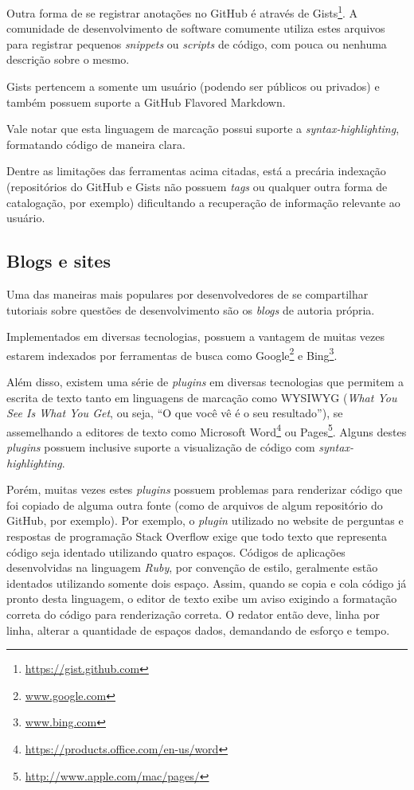 Outra forma de se registrar anotações no GitHub é através de Gists\footnote{\url{https://gist.github.com}}. A comunidade de desenvolvimento de software comumente utiliza estes arquivos para registrar pequenos \textit{snippets} ou \textit{scripts} de código, com pouca ou nenhuma descrição sobre o mesmo.

Gists pertencem a somente um usuário (podendo ser públicos ou privados) e também possuem suporte a GitHub Flavored Markdown.

Vale notar que esta linguagem de marcação possui suporte a \textit{syntax-highlighting}, formatando código de maneira clara.

Dentre as limitações das ferramentas acima citadas, está a precária indexação (repositórios do GitHub e Gists não possuem \textit{tags} ou qualquer outra forma de catalogação, por exemplo) dificultando a recuperação de informação relevante ao usuário.

\subsection{Blogs e sites}

Uma das maneiras mais populares por desenvolvedores de se compartilhar tutoriais sobre questões de desenvolvimento são os \textit{blogs} de autoria própria.

Implementados em diversas tecnologias, possuem a vantagem de muitas vezes estarem indexados por ferramentas de busca como Google\footnote{\url{www.google.com}} e Bing\footnote{\url{www.bing.com}}.

Além disso, existem uma série de \textit{plugins} em diversas tecnologias que permitem a escrita de texto tanto em linguagens de marcação como WYSIWYG (\textit{What You See Is What You Get}, ou seja, ``O que você vê é o seu resultado''), se assemelhando a editores de texto como Microsoft Word\footnote{\url{https://products.office.com/en-us/word}} ou Pages\footnote{\url{http://www.apple.com/mac/pages/}}. Alguns destes \textit{plugins} possuem inclusive suporte a visualização de código com \textit{syntax-highlighting}.

Porém, muitas vezes estes \textit{plugins} possuem problemas para renderizar código que foi copiado de alguma outra fonte (como de arquivos de algum repositório do GitHub, por exemplo). Por exemplo, o \textit{plugin} utilizado no website de perguntas e respostas de programação Stack Overflow exige que todo texto que representa código seja identado utilizando quatro espaços. Códigos de aplicações desenvolvidas na linguagem \textit{Ruby}, por convenção de estilo, geralmente estão identados utilizando somente dois espaço. Assim, quando se copia e cola código já pronto desta linguagem, o editor de texto exibe um aviso exigindo a formatação correta do código para renderização correta. O redator então deve, linha por linha, alterar a quantidade de espaços dados, demandando de esforço e tempo.

